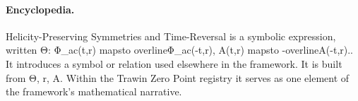 \paragraph{Encyclopedia.}
Helicity-Preserving Symmetries and Time-Reversal is a symbolic expression, written Θ: Φ\_ac(t,r) mapsto overlineΦ\_ac(-t,r), A(t,r) mapsto -overlineA(-t,r).. It introduces a symbol or relation used elsewhere in the framework. It is built from Θ, r, A. Within the Trawin Zero Point registry it serves as one element of the framework's mathematical narrative.
